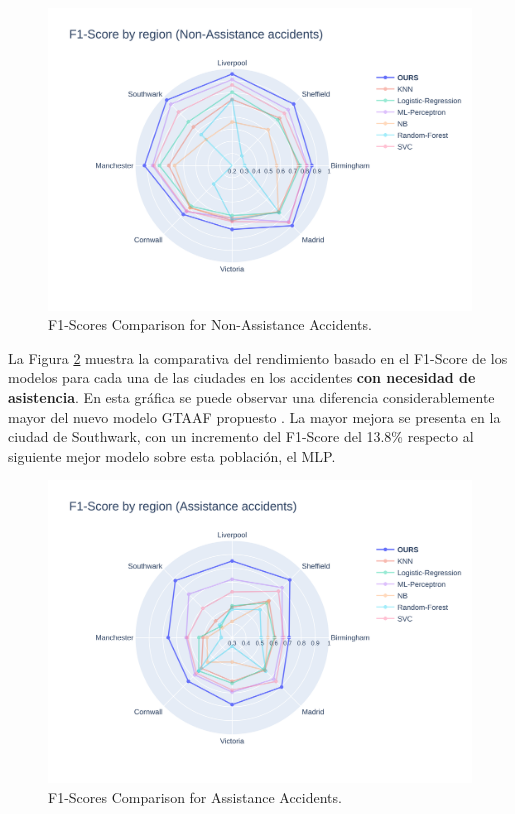 \documentclass{uathesis-es}
\begin{document}
{\begin{figure}[H]
    \centering
    \includegraphics[width=150mm]{Figures/Slight.png}
    \caption{F1-Scores Comparison for Non-Assistance Accidents.}
    \label{GlobalSlightF1Score}
\end{figure}

La Figura \ref{GlobalAssistanceF1Score} muestra la comparativa del rendimiento basado en el F1-Score de los modelos para cada una de las ciudades en los accidentes \textbf{con necesidad de asistencia}. En esta gráfica se puede observar una diferencia considerablemente mayor del nuevo modelo GTAAF propuesto . La mayor mejora se presenta en la ciudad de Southwark, con un incremento del F1-Score del 13.8\% respecto al siguiente mejor modelo sobre esta población, el MLP.

\begin{figure}[H]
    \centering
    \includegraphics[width=150mm]{Figures/Assistance.png}
    \caption{F1-Scores Comparison for Assistance Accidents.}
    \label{GlobalAssistanceF1Score}
\end{figure}

}
\end{document}
